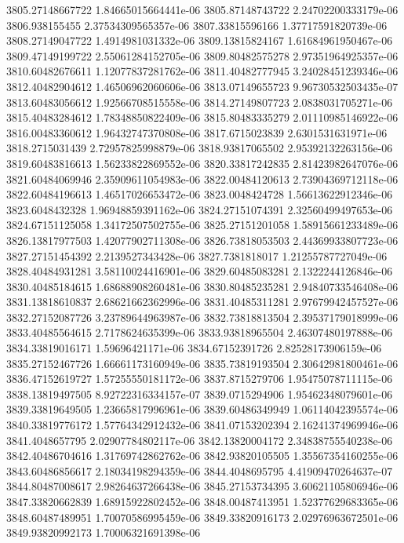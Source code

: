 {3805.27148667722 1.84665015664441e-06
3805.87148743722 2.24702200333179e-06
3806.938155455 2.37534309565357e-06
3807.33815596166 1.37717591820739e-06
3808.27149047722 1.4914981031332e-06
3809.13815824167 1.61684961950467e-06
3809.47149199722 2.55061284152705e-06
3809.80482575278 2.97351964925357e-06
3810.60482676611 1.12077837281762e-06
3811.40482777945 3.24028451239346e-06
3812.40482904612 1.46506962060606e-06
3813.07149655723 9.96730532503435e-07
3813.60483056612 1.92566708515558e-06
3814.27149807723 2.0838031705271e-06
3815.40483284612 1.78348850822409e-06
3815.80483335279 2.01110985146922e-06
3816.00483360612 1.96432747370808e-06
3817.6715023839 2.6301531631971e-06
3818.2715031439 2.72957825998879e-06
3818.93817065502 2.95392132263156e-06
3819.60483816613 1.56233822869552e-06
3820.33817242835 2.81423982647076e-06
3821.60484069946 2.35909611054983e-06
3822.00484120613 2.73904369712118e-06
3822.60484196613 1.46517026653472e-06
3823.0048424728 1.56613622912346e-06
3823.6048432328 1.96948859391162e-06
3824.27151074391 2.32560499497653e-06
3824.67151125058 1.34172507502755e-06
3825.27151201058 1.58915661233489e-06
3826.13817977503 1.42077902711308e-06
3826.73818053503 2.44369933807723e-06
3827.27151454392 2.2139527343428e-06
3827.7381818017 1.21255787727049e-06
3828.40484931281 3.58110024416901e-06
3829.60485083281 2.1322244126846e-06
3830.40485184615 1.68688908260481e-06
3830.80485235281 2.94840733546408e-06
3831.13818610837 2.68621662362996e-06
3831.40485311281 2.97679942457527e-06
3832.27152087726 3.23789644963987e-06
3832.73818813504 2.39537179018999e-06
3833.40485564615 2.7178624635399e-06
3833.93818965504 2.46307480197888e-06
3834.33819016171 1.59696421171e-06
3834.67152391726 2.82528173906159e-06
3835.27152467726 1.66661173160949e-06
3835.73819193504 2.30642981800461e-06
3836.47152619727 1.57255550181172e-06
3837.8715279706 1.95475078711115e-06
3838.13819497505 8.92722316334157e-07
3839.0715294906 1.95462348079601e-06
3839.33819649505 1.23665817996961e-06
3839.60486349949 1.06114042395574e-06
3840.33819776172 1.57764342912432e-06
3841.07153202394 2.16241374969946e-06
3841.4048657795 2.02907784802117e-06
3842.13820004172 2.34838755540238e-06
3842.40486704616 1.31769742862762e-06
3842.93820105505 1.35567354160255e-06
3843.60486856617 2.18034198294359e-06
3844.4048695795 4.41909470264637e-07
3844.80487008617 2.98264637266438e-06
3845.27153734395 3.60621105806946e-06
3847.33820662839 1.68915922802452e-06
3848.00487413951 1.52377629683365e-06
3848.60487489951 1.70070586995459e-06
3849.33820916173 2.02976963672501e-06
3849.93820992173 1.70006321691398e-06
}
